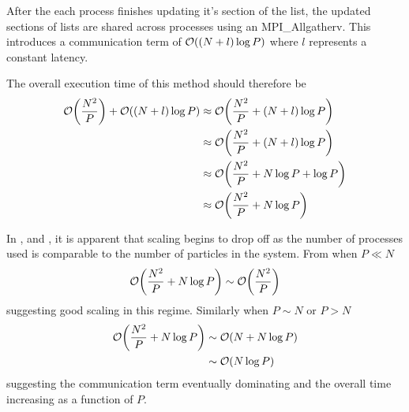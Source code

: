 After the each process finishes updating it's section of the list,
the updated sections of lists are shared across processes using
an MPI\_Allgatherv.
This introduces a communication term of $\mathcal{O}{\left({ (N + l)\log{P} }\right)}$
where $l$ represents a constant latency.

The overall execution time of this method should therefore be
\begin{align}
    \mathcal{O}{\left({ \frac{N^2}{P} }\right)} + \mathcal{O}{\left({ (N+l)\log{P} }\right)}
        &\approx{} \mathcal{O}{\left({ \frac{N^2}{P} + (N+l)\log{P} }\right)} \\
        &\approx{} \mathcal{O}{\left({ \frac{N^2}{P} + (N+l)\log{P} }\right)} \\
        &\approx{} \mathcal{O}{\left({ \frac{N^2}{P} + N\log{P} + \log{P} }\right)} \\
        \label{eqn:v0_replicated_pair_operation_overall_time}
        &\approx{} \mathcal{O}{\left({ \frac{N^2}{P} + N\log{P} }\right)}
\end  {align}

\begin{figure}[!h]
    
    \caption{}
    \label{fig:v0_replicated_pair_operation_512_logtime}
\end  {figure}

\begin{figure}[!h]
    
    \caption{}
    \label{fig:v0_replicated_pair_operation_4096_logtime}
\end  {figure}

\begin{figure}[!h]
    
    \caption{}
    \label{fig:v0_replicated_pair_operation_32768_logtime}
\end  {figure}

\vZeroTimeExplanation
    {  }
    {  }
    {  }
    { \pairoperation{} }

In ,
 and
,
it is apparent that scaling begins to drop off as the number
of processes used is comparable to the number of particles in the system.
%
From  when $P \ll{} N$
\begin{equation}
    \mathcal{O}{\left({ \frac{N^2}{P} + N\log{P} }\right)} \sim{} \mathcal{O}{\left({ \frac{N^2}{P} }\right)}
\end  {equation}
suggesting good scaling in this regime.
%
Similarly when $P \sim{} N$
or $P > N$
\begin{align}
    \mathcal{O}{\left({ \frac{N^2}{P} + N\log{P} }\right)}
        &\sim{} \mathcal{O}{\left({ N + N\log{P} }\right)} \\
        &\sim{} \mathcal{O}{\left({ N\log{P} }\right)}
\end  {align}
%
suggesting the communication term eventually dominating and
the overall time increasing as a function of $P$.

